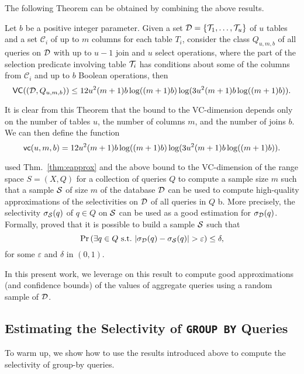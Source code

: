 The following Theorem can be obtained by combining the above results.

\begin{theorem}\label{thm:vcdimgenqueries}
Let $b$ be a positive integer parameter. Given a set
${\cal D}=\{{\cal T}_1,\dotsc,{\cal T}_u\}$ of $u$ tables and a set $\mathcal{C}_i$ of
up to $m$ columns for each table $T_i$, consider the class $Q_{u,m,b}$ of all
queries on ${\cal D}$ with up to $u-1$ join and $u$ select operations, where the
part of the selection predicate involving table ${\cal T}_i$ has conditions about
some of the columns from $\mathcal{C}_i$ and up to $b$ Boolean operations, then 
\[
\mathsf{VC}(({\cal D},Q_{u,m,b})) \leq 
12u^2(m+1)b\log((m+1)b)\log(3u^2(m+1)b\log((m+1)b)).\]
\end{theorem}
It is clear from this Theorem that the bound to the VC-dimension depends
only on the number of tables $u$, the number of columns $m$, and the number of
joins $b$. We can then define the function
\[
\mathsf{vc}(u,m,b)=12u^2(m+1)b\log((m+1)b)\log(3u^2(m+1)b\log((m+1)b)).\]

\citet{RiondatoACZU11} used Thm.~\ref{thm:eapprox} and the above bound to the
VC-dimension of the range space $S=(X,Q)$ for a collection of queries $Q$ to
compute a sample size $m$ such that a sample ${\cal S}$ of size $m$ of the database
${\cal D}$ can be used to compute high-quality approximations of the selectivities on
${\cal D}$ of all queries in $Q$ b. More precisely, the selectivity
$\sigma_{\cal S}(q)$ of $q\in Q$ on ${\cal S}$ can be used as a good estimation
for $\sigma_{\cal D}(q)$. Formally, \citet{RiondatoACZU11} proved that it is
possible to build a sample ${\cal S}$ such that
\[
\Pr\left(\exists q\in Q \mbox{ s.t.~}
|\selectivity_\Db(q)-\selectivity_\Sam(q)|>\varepsilon\right)\le\delta,
\]
for some $\varepsilon$ and $\delta$ in $(0,1)$.


In this present work, we leverage on this result to compute good approximations
(and confidence bounds) of the values of aggregate queries using a random sample
of ${\cal D}$.

\subsection{Estimating the Selectivity of \texttt{GROUP BY} Queries}\label{sec:groupby}
To warm up, we show how to use the results introduced above to compute the
selectivity of group-by queries.


